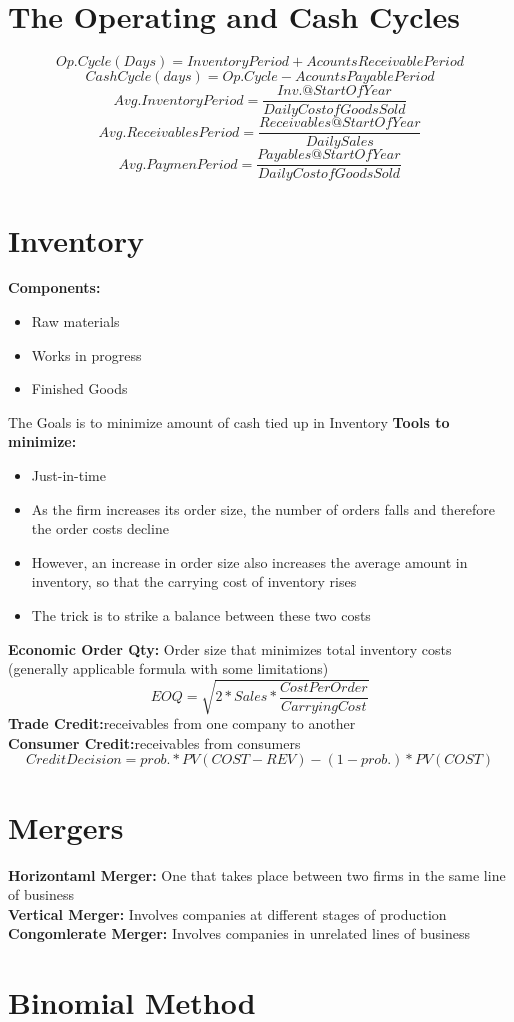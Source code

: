 \documentclass{cheatsheet}
\begin{document}
\section{The Operating and Cash Cycles}
\[Op.Cycle(Days)=InventoryPeriod+AcountsReceivablePeriod\]
\[CashCycle(days)=Op.Cycle-AcountsPayablePeriod\]
\vspace{40mm}
\[Avg.InventoryPeriod = \frac{Inv.@StartOfYear}{DailyCostofGoodsSold}\]
\[Avg.ReceivablesPeriod = \frac{Receivables@StartOfYear}{DailySales}\]
\[Avg.PaymenPeriod = \frac{Payables@StartOfYear}{DailyCostofGoodsSold}\]

\section{Inventory}
\textbf{Components:}\begin{itemize}
  \item Raw materials
  \item Works in progress
  \item Finished Goods
\end{itemize}
The Goals is to minimize amount of cash tied up in Inventory
\textbf{Tools to minimize:}\begin{itemize}
  \item Just-in-time
  \item As the firm increases its order size, the number of orders falls and therefore the order costs decline
  \item However, an increase in order size also increases the average amount in inventory, so that the carrying cost of inventory rises
  \item The trick is to strike a balance between these two costs
\end{itemize}
\textbf{Economic Order Qty:} Order size that minimizes total inventory costs (generally applicable formula
with some limitations)
\[EOQ = \sqrt{2*Sales*\frac{CostPerOrder}{CarryingCost}}\]
\textbf{Trade Credit:}receivables from one company to another\\
\textbf{Consumer Credit:}receivables from consumers\\
\[Credit Decision = prob. * PV(COST-REV) - (1-prob.) * PV(COST)\]

\section{Mergers}
\textbf{Horizontaml Merger:} One that takes place between two firms
in the same line of business\\
\textbf{Vertical Merger:} Involves companies at different stages of production\\
\textbf{Congomlerate Merger:} Involves companies in unrelated lines of business\\



\section*{Binomial Method}
\end{document}
